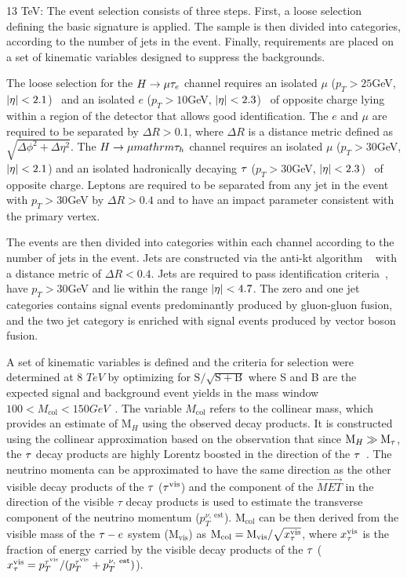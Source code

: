 \documentclass[oneside, letterpaper, oldfontcommands]{memoir}
\DeclarePairedDelimiter{\abs}{\lvert}{\rvert}
\begin{document}
{{{13 TeV:
The event selection consists of three steps. First, a loose selection defining the basic
signature is applied. The sample is then divided into categories, according to the number of jets in the event.
Finally, requirements are placed on  a set of kinematic variables designed to suppress the backgrounds.

The loose selection for the  $H \rightarrow \mu \mathrm{\tau}_{e}$  channel requires an isolated  $\mu$
($p_{T} > 25$GeV, 
$\abs{\eta} <2.1$)~\cite{Chatrchyan:2012xi} 
and an  isolated  $e$ ($p_{T} > 10$GeV, $\abs{\eta} <2.3$)~\cite{Khachatryan:2015hwa}  
of opposite charge lying within a region of the detector that allows good identification. The $e$ and $\mu$ are required to be separated by 
$\Delta R >0.1$, where $\Delta R$ is a distance metric defined as $\sqrt{\Delta\phi^{2} + \Delta\eta^{2}}$. The
$H \rightarrow \mu mathrm{\tau_{h}}$ channel requires an isolated $\mu$ ($p_{T} > 30$GeV, $\abs{\eta} <2.1$) and an  isolated  hadronically decaying  $\mathrm{\tau}$ ($p_{T} >30$GeV, $\abs{\eta} <2.3$)~\cite{Khachatryan:2015dfa} of opposite charge.
Leptons
are required to be separated from any jet in the event with $p_{T} >30$GeV by $\Delta R > 0.4$ and to have an impact parameter consistent with the primary vertex.

The events are then divided into categories within each channel according to the number of jets in the
event. Jets are constructed via the anti-kt algorithm ~\cite{Cacciari:2008gp} with a distance metric of $\Delta R < 0.4$. Jets are required to pass  identification criteria~\cite{CMS-PAS-JME-13-005}, have $p_{T}> 30$GeV and
lie within the range $\abs{\eta} < 4.7$. The zero and one jet categories contains signal events predominantly produced by gluon-gluon fusion, and the two jet category is enriched with signal events produced by vector boson fusion.

A set of kinematic variables is defined and the  criteria for  selection were determined at  8 $TeV$ by optimizing for $\mathrm{S}/\sqrt{\mathrm{S}+\mathrm{B}}$ where S and B are the expected signal and background event yields in the mass window $100  < M_\text{col} <  150GeV$~\cite{Khachatryan:2015kon}. The variable $M_\text{col}$ refers to the collinear mass, which provides an estimate of $\text{M}_{H}$ using the observed
decay products. It is constructed using the collinear approximation based on
the observation that since \mbox{$\text{M}_{H}\gg \text{M}_{\mathrm{\tau}}$}, the $\mathrm{\tau}$ decay products are
highly Lorentz boosted in the direction of the  $\mathrm{\tau}$~\cite{Ellis:1987xu}.
The neutrino momenta
can be approximated to have the same
direction as the other visible decay products of the $\mathrm{\tau}$ ($\mathrm{\tau}^\text{vis}$)
and the component of the $\vec{MET}$ in the direction of the visible $\tau$ decay products is used to estimate the transverse component of the neutrino momentum ($p_{T}^{\nu,~\text{est}}$).
$\text{M}_{\text{col}}$ can be then derived from the visible mass of the $\mathrm{\tau}-e$ system ($\text{M}_{\text{vis}}$) as $\text{M}_{\text{col}}= \text{M}_{\text{vis}} / \sqrt{x_{\mathrm{\tau}}^\text{vis}}$, where $x_{\mathrm{\tau}}^\text{vis}$ is the fraction of energy carried by the visible decay products of the $\mathrm{\tau}$ ($x_{\mathrm{\tau}}^\text{vis}={p_{T}^{\mathrm{\tau}^{\text{vis}}}}/{(p_{T}^{\mathrm{\tau}^\text{vis}}+p_{T}^{\nu,~\text{est}})}$).

}}}
\end{document}
